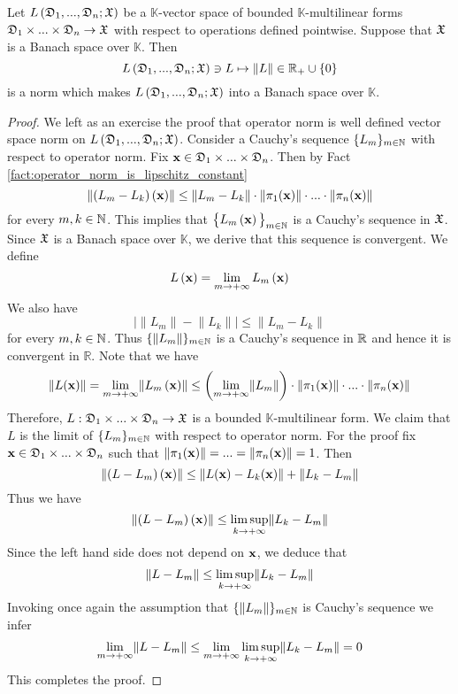 \begin{theorem}\label{theorem:bounded_multilinear_maps_form_Banach_space_if_target_is_Banach}
Let $L\left({\mathfrak D}_1,...,{\mathfrak D}_n;{\mathfrak X}\right)$ be a $\mathbb{K}$-vector space of bounded $\mathbb{K}$-multilinear forms ${\mathfrak D}_1\times ... \times {\mathfrak D}_n\rightarrow {\mathfrak X}$ with respect to operations defined pointwise. Suppose that ${\mathfrak X}$ is a Banach space over $\mathbb{K}$. Then 
$$L\left({\mathfrak D}_1,...,{\mathfrak D}_n;{\mathfrak X}\right) \ni L\mapsto \lVert L\rVert\in {\mathbb R}_+\cup \{0\}$$
is a norm which makes $L\left({\mathfrak D}_1,...,{\mathfrak D}_n;{\mathfrak X}\right)$ into a Banach space over $\mathbb{K}$.
\end{theorem}
\begin{proof}
We left as an exercise the proof that operator norm is well defined vector space norm on $L\left({\mathfrak D}_1,...,{\mathfrak D}_n;{\mathfrak X}\right)$. Consider a Cauchy's sequence $\{L_m\}_{m\in {\mathbb N}}$ with respect to operator norm. Fix $\mathbf{x} \in {\mathfrak D}_1\times ... \times {\mathfrak D}_n$. Then by Fact \ref{fact:operator_norm_is_lipschitz_constant}
$$\lVert \left(L_m - L_k\right)\left(\mathbf{x}\right)\rVert \leq \lVert L_m-L_k \rVert\cdot \lVert \pi_1(\mathbf{x})\rVert\cdot ...\cdot \lVert \pi_n(\mathbf{x})\rVert$$
for every $m,k\in {\mathbb N}$. This implies that $\big\{L_m\left(\mathbf{x}\right)\big\}_{m\in {\mathbb N}}$ is a Cauchy's sequence in ${\mathfrak X}$. Since ${\mathfrak X}$ is a Banach space over $\mathbb{K}$, we derive that this sequence is convergent. We define
$$L\left(\mathbf{x}\right) = \lim_{m\rightarrow +\infty}L_m\left(\mathbf{x}\right)$$
We also have
$$\big|\lVert L_m\rVert - \lVert L_k\rVert\big| \leq \lVert L_m - L_k\rVert$$
for every $m,k \in {\mathbb N}$. Thus $\{\lVert L_m \rVert\}_{m\in {\mathbb N}}$ is a Cauchy's sequence in ${\mathbb R}$ and hence it is convergent in $\mathbb{R}$.  Note that we have
$$\lVert L(\mathbf{x})\rVert = \lim_{m\rightarrow +\infty}\lVert L_m\left(\mathbf{x}\right)\rVert \leq \left(\lim_{m\rightarrow +\infty}\lVert L_m \rVert\right) \cdot \lVert \pi_1(\mathbf{x})\rVert \cdot ...\cdot \lVert \pi_n(\mathbf{x})\rVert$$
Therefore, $L:{\mathfrak D}_1\times ... \times {\mathfrak D}_n\rightarrow {\mathfrak X}$ is a bounded $\mathbb{K}$-multilinear form. We claim that $L$ is the limit of $\{L_m\}_{m\in {\mathbb N}}$ with respect to operator norm. For the proof fix $\mathbf{x} \in {\mathfrak D}_1\times ... \times {\mathfrak D}_n$ such that $\lVert \pi_1(\mathbf{x})\rVert=...= \lVert\pi_n(\mathbf{x})\rVert = 1$. Then
$$\lVert \left(L - L_m\right)(\mathbf{x})\rVert \leq \lVert L(\mathbf{x}) - L_k(\mathbf{x})\rVert + \lVert L_k - L_m \rVert$$
Thus we have
$$\lVert \left(L - L_m\right)(\mathbf{x}) \rVert \leq \limsup_{k\rightarrow +\infty}\lVert L_k - L_m \rVert$$
Since the left hand side does not depend on $\mathbf{x}$, we deduce that
$$\lVert L - L_m\rVert \leq \limsup_{k\rightarrow +\infty}\lVert L_k - L_m\rVert$$
Invoking once again the assumption that $\{\lVert L_m \rVert\}_{m\in {\mathbb N}}$ is Cauchy's sequence we infer
$$\lim_{m\rightarrow +\infty}\lVert L - L_m \rVert \leq \lim_{m\rightarrow +\infty}\limsup_{k\rightarrow +\infty}\lVert L_k - L_m\rVert = 0$$
This completes the proof.
\end{proof}

